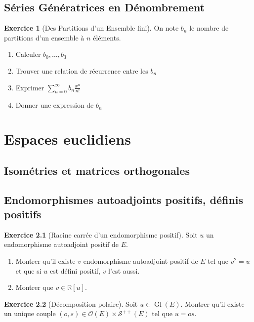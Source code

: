 \documentclass[12pt,a4paper]{book}
\theoremstyle{definition}
\newtheorem{exo}{Exercice}[section]
\theoremstyle{remark}
\newcommand{\R}{\mathbb{R}}
\DeclareMathOperator{\Gl}{Gl}
\begin{document}
\section{Séries Génératrices en Dénombrement}

\begin{exo}[Des Partitions d'un Ensemble fini]
    On note $b_{n}$ le nombre de partitions d'un ensemble à $n$ éléments.
    \begin{enumerate}
        \item Calculer $b_{0}, \dots, b_{3}$
        \item Trouver une relation de récurrence entre les $b_{n}$
        \item Exprimer $\sum\limits_{n=0}^{\infty}b_{n}\frac{x^{n}}{n!}$
        \item Donner une expression de $b_{n}$
    \end{enumerate}
\end{exo}

\chapter{Espaces euclidiens}

\section{Isométries et matrices orthogonales}

\section{Endomorphismes autoadjoints positifs, définis positifs}

\begin{exo}[Racine carrée d'un endomorphisme positif]
    Soit $u$ un endomorphisme autoadjoint positif de $E$.
    \begin{enumerate}
        \item Montrer qu'il existe $v$ endomorphisme autoadjoint positif de $E$ tel que $v^2 = u$ et que si $u$ est défini positif, $v$ l'est aussi.
        \item Montrer que $v \in \R [u]$.
    \end{enumerate}
\end{exo}

\begin{exo}[Décomposition polaire]
    Soit $u \in \Gl (E)$. Montrer qu'il existe un unique couple $(o, s) \in \mathcal{O}(E) \times \mathcal{S}^{++} (E)$ tel que $u=os$.
\end{exo}
\end{document}
